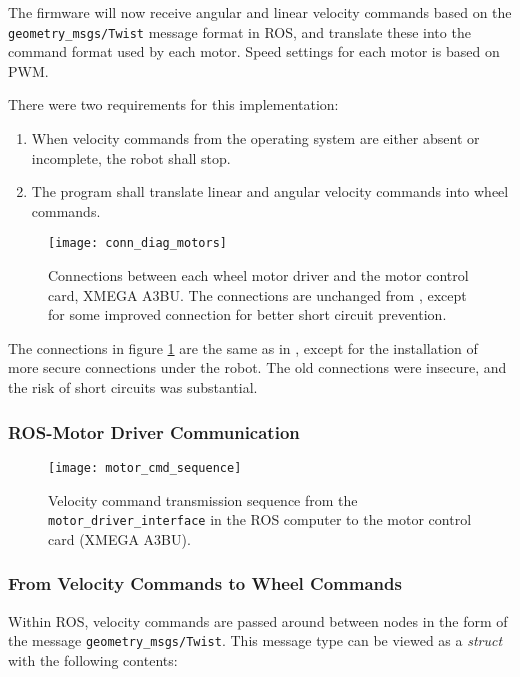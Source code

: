 The firmware will now receive angular and linear velocity commands based on the \texttt{geometry\_msgs/Twist} message format in \ac{ROS}, and translate these into the command format used by each motor. Speed settings for each motor is based on \ac{PWM}. 

There were two requirements for this implementation: 
\begin{enumerate}
\item When velocity commands from the operating system are either absent or incomplete, the robot shall stop.
\item The program shall translate linear and angular velocity commands into wheel commands.
\end{enumerate}

\begin{figure}[h]
	\centering
	\texttt{[image: conn\_diag\_motors]}
	\caption{Connections between each wheel motor driver and the motor control card, XMEGA A3BU. The connections are unchanged from \cite{aspunvik}, except for some improved connection for better short circuit prevention.}
	\label{fig:conn_diag_motors}
\end{figure}

The connections in figure \ref{fig:conn_diag_motors} are the same as in \cite{aspunvik}, except for the installation of more secure connections under the robot. The old connections were insecure, and the risk of short circuits was substantial.

\subsubsection{ROS-Motor Driver Communication}

\begin{figure}[h]
	\centering
	\texttt{[image: motor\_cmd\_sequence]}
	\caption{Velocity command transmission sequence from the \texttt{motor\_driver\_interface} in the ROS computer to the motor control card (XMEGA A3BU).}
	\label{fig:motor_cmd_sequence}
\end{figure}


\subsubsection{From Velocity Commands to Wheel Commands}

Within \ac{ROS}, velocity commands are passed around between nodes in the form of the message \texttt{geometry\_msgs/Twist}. This message type can be viewed as a \textit{struct} with the following contents:

